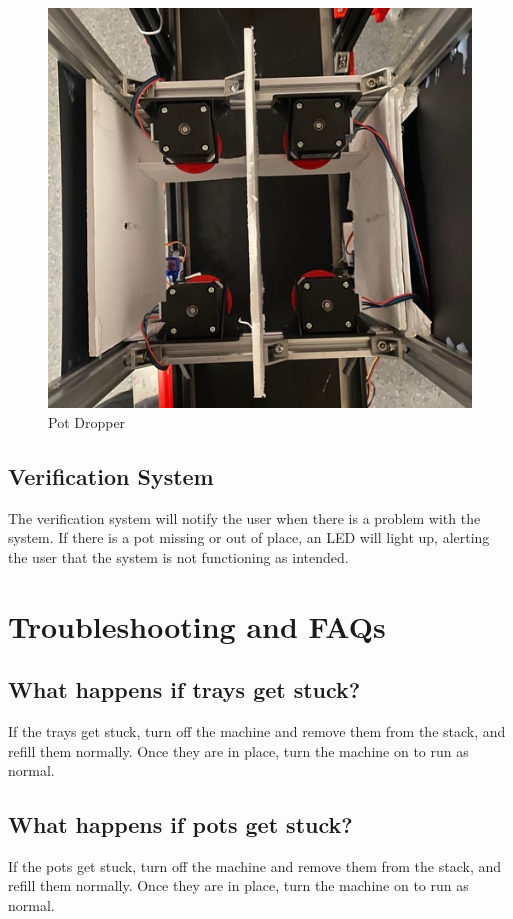 \documentclass{article}
\begin{document}
\begin{figure}[H]
    \centering
    \includegraphics[width=\textwidth]{pot.jpg}
    \caption{Pot Dropper}
    \label{fig:scope}
  \end{figure}

\subsection{Verification System}
The verification system will notify the user when there is a problem with the system. If there is a pot missing or out of place, an LED will light up, alerting the user that the system is not functioning as intended. 
\section{Troubleshooting and FAQs}
\subsection{What happens if trays get stuck?}
If the trays get stuck, turn off the machine and remove them from the stack, and refill them normally. Once they are in place, turn the machine on to run as normal.
\subsection{What happens if pots get stuck?}
If the pots get stuck, turn off the machine and remove them from the stack, and refill them normally. Once they are in place, turn the machine on to run as normal.
\end{document}
